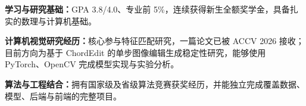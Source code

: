 
\begin{ResumeItemize}
  \item \textbf{学习与研究基础：}GPA 3.8/4.0、专业前 5\%，连续获得新生全额奖学金，具备扎实的数理与计算机基础。
  \item \textbf{计算机视觉研究经历：}核心参与特征匹配研究，一篇论文已被 ACCV 2026 接收；目前方向为基于 ChordEdit 的单步图像编辑生成稳定性研究，能够使用 PyTorch、OpenCV 完成模型实现与实验分析。
  \item \textbf{算法与工程结合：}拥有国家级及省级算法竞赛获奖经历，并能独立完成覆盖数据、模型、后端与前端的完整项目。
\end{ResumeItemize}
